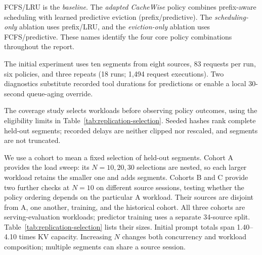 FCFS/LRU is the \emph{baseline}.
The \emph{adapted CacheWise} policy combines prefix-aware scheduling with learned predictive eviction (prefix/predictive).
The \emph{scheduling-only} ablation uses prefix/LRU, and the \emph{eviction-only} ablation uses FCFS/predictive.
These names identify the four core policy combinations throughout the report.

The initial experiment uses ten segments from eight sources, 83 requests per run, six policies, and three repeats (18 runs; 1,494 request executions).
Two diagnostics substitute recorded tool durations for predictions or enable a local 30-second queue-aging override.

The coverage study selects workloads before observing policy outcomes, using the eligibility limits in Table~\ref{tab:replication-selection}.
Seeded hashes rank complete held-out segments; recorded delays are neither clipped nor rescaled, and segments are not truncated.

We use a cohort to mean a fixed selection of held-out segments.
Cohort A provides the load sweep: its $N=10,20,30$ selections are nested, so each larger workload retains the smaller one and adds segments.
Cohorts B and C provide two further checks at $N=10$ on different source sessions, testing whether the policy ordering depends on the particular A workload.
Their sources are disjoint from A, one another, training, and the historical cohort.
All three cohorts are serving-evaluation workloads; predictor training uses a separate 34-source split.
Table~\ref{tab:replication-selection} lists their sizes.
Initial prompt totals span 1.40--4.10 times KV capacity.
Increasing $N$ changes both concurrency and workload composition; multiple segments can share a source session.

